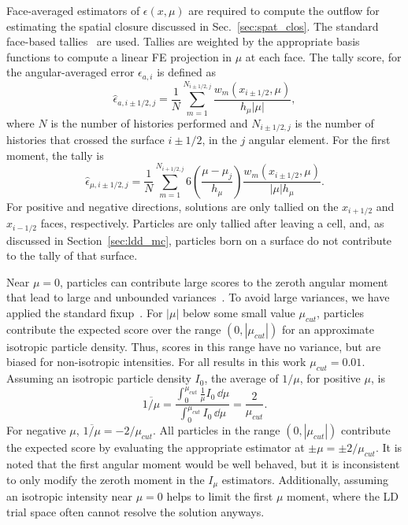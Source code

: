 Face-averaged estimators of $\epsilon(x,\mu)$ are required to compute the outflow for
estimating the spatial closure discussed in Sec.~\ref{sec:spat_clos}. The standard face-based
tallies~\cite{shultis_mc,favorite_faces} are used.  Tallies are weighted by
the appropriate basis functions to compute a linear FE projection in $\mu$ at each face.  The
tally score, for the angular-averaged error $\epsilon_{a,i}$ is defined as
\begin{equation}
    \hat \epsilon_{a,i\pm1/2,j} = \frac{1}{N} \sum_{m=1}^{N_{i\pm1/2,j}}
    \frac{w_m(x_{i\pm1/2},\mu)}{h_{\mu} |\mu|},
\end{equation}
where $N$ is the number of histories performed and $N_{i\pm1/2,j}$ is the number of histories
that crossed the surface $i\pm1/2$, in the $j$ angular element.   For the first
moment, the tally is
\begin{equation}\label{eq:face_mutally}
    \hat \epsilon_{\mu,i\pm1/2,j} = \frac{1}{N} \sum_{m=1}^{N_{i+1/2,j}} 
    6\left(\frac{\mu-\mu_j}{h_\mu}\right) \frac{w_m(x_{i\pm1/2},\mu)}{|\mu| h_{\mu}}.
\end{equation}
For positive and negative directions, solutions are only tallied
on the $x_{i+1/2}$ and $x_{i-1/2}$ faces, respectively. Particles are only tallied after leaving
a cell, and, as discussed in Section~\ref{sec:ldd_mc}, particles born on a surface do not contribute
to the tally of that surface.

Near $\mu=0$, particles can contribute large scores to the zeroth angular moment that lead to large and
unbounded variances~\cite{favorite_faces}.  To avoid large variances, we have applied the standard fixup~\cite{mcnp,favorite_faces}.  
For $|\mu|$ below some small value $\mu_{cut}$, 
particles contribute the expected score over the range $(0,|\mu_{cut}|)$ for an
approximate isotropic particle density. Thus, scores in this range have no variance, but are biased
for non-isotropic intensities.  For all results in this work $\mu_{cut}=0.01$.  Assuming
an isotropic particle density $I_0$, the average of
$1/\mu$, for positive $\mu$, is
\begin{equation}
    \overline{1/\mu} = \frac{\displaystyle \int_0^{\mu_{cut}}\frac{1}{\mu} I_0 \,\dd
\mu}{\displaystyle \int_0^{\mu_{cut}} I_0\, \dd \mu} =
    \frac{2}{\mu_{cut}}.
\end{equation}
For negative $\mu$, $\overline{1/\mu}=-2/\mu_{cut}$.
All particles in the range $(0,|\mu_{cut}|)$ contribute the expected score by evaluating
the appropriate estimator at $\pm\mu = \pm2/\mu_{cut}$.  It is noted that the first angular moment would be well behaved, but it is inconsistent to only modify the zeroth 
moment in the $I_\mu$ estimators. Additionally, assuming an isotropic intensity near $\mu=0$ helps to limit
the first $\mu$ moment, where the LD trial space often cannot resolve the solution anyways.

